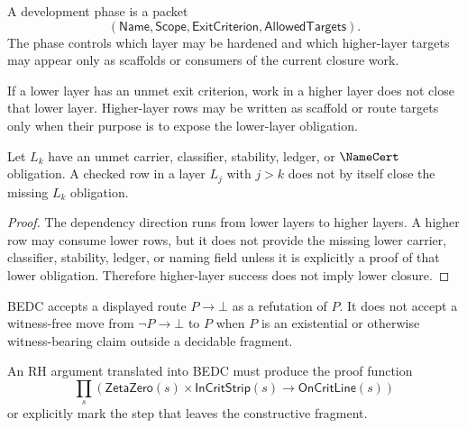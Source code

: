 \begin{definition}
\label{def:mature-bridge-spine-phase}
A development phase is a packet
$$
(\mathsf{Name},\mathsf{Scope},\mathsf{ExitCriterion},\mathsf{AllowedTargets}).
$$
The phase controls which layer may be hardened and which higher-layer targets
may appear only as scaffolds or consumers of the current closure work.
\end{definition}

\begin{principle}
\label{prin:mature-bridge-spine-lowest-open-layer}
If a lower layer has an unmet exit criterion, work in a higher layer does not
close that lower layer.  Higher-layer rows may be written as scaffold or route
targets only when their purpose is to expose the lower-layer obligation.
\end{principle}

\begin{theorem}
\label{thm:mature-bridge-spine-higher-does-not-close-lower}
Let $L_k$ have an unmet carrier, classifier, stability, ledger, or
$\NameCert$ obligation.  A checked row in a layer $L_j$ with $j>k$ does not by
itself close the missing $L_k$ obligation.
\end{theorem}

\begin{proof}
The dependency direction runs from lower layers to higher layers.  A higher
row may consume lower rows, but it does not provide the missing lower carrier,
classifier, stability, ledger, or naming field unless it is explicitly a proof
of that lower obligation.  Therefore higher-layer success does not imply lower
closure.
\end{proof}

\begin{definition}
\label{def:mature-bridge-spine-refutation-boundary}
BEDC accepts a displayed route $P\to\bot$ as a refutation of $P$.  It does not
accept a witness-free move from $\neg P\to\bot$ to $P$ when $P$ is an
existential or otherwise witness-bearing claim outside a decidable fragment.
\end{definition}

\begin{principle}
\label{prin:mature-bridge-spine-rh-contradiction}
An RH argument translated into BEDC must produce the proof function
$$
\prod_s
\left(
\mathsf{ZetaZero}(s)\times\mathsf{InCritStrip}(s)
\to
\mathsf{OnCritLine}(s)
\right)
$$
or explicitly mark the step that leaves the constructive fragment.
\end{principle}

